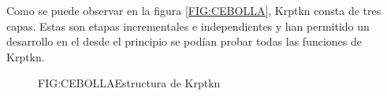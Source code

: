 Como se puede observar en la figura \ref{FIG:CEBOLLA}, Krptkn consta de tres capas. Estas son etapas incrementales e independientes y han permitido un desarrollo en el desde el principio se podían probar todas las funciones de Krptkn.

\begin{figure}[cebolla]{FIG:CEBOLLA}{Estructura de Krptkn}
\end{figure}